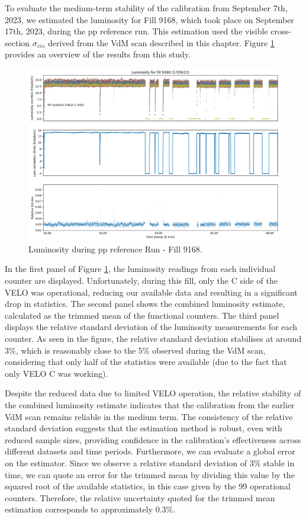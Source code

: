 To evaluate the medium-term stability of the calibration from September 7th, 2023, we estimated the luminosity for Fill 9168, which took place on September 17th, 2023, during the pp reference run. This estimation used the visible cross-section $\sigma_{vis}$ derived from the VdM scan described in this chapter. Figure \ref{fig:fill9168} provides an overview of the results from this study.
\begin{figure}
    \centering
    \includegraphics[width=\textwidth]{figures/fill9168.png}
    \caption{Luminosity during pp reference Run - Fill 9168.}
    \label{fig:fill9168}
\end{figure}
In the first panel of Figure \ref{fig:fill9168}, the luminosity readings from each individual counter are displayed. Unfortunately, during this fill, only the C side of the VELO was operational, reducing our available data and resulting in a significant drop in statistics. The second panel shows the combined luminosity estimate, calculated as the trimmed mean of the functional counters. The third panel displays the relative standard deviation of the luminosity measurements for each counter. As seen in the figure, the relative standard deviation stabilises at around 3\%, which is reasonably close to the 5\% observed during the VdM scan, considering that only half of the statistics were available (due to the fact that only VELO C was working).

Despite the reduced data due to limited VELO operation, the relative stability of the combined luminosity estimate indicates that the calibration from the earlier VdM scan remains reliable in the medium term. The consistency of the relative standard deviation suggests that the estimation method is robust, even with reduced sample sizes, providing confidence in the calibration's effectiveness across different datasets and time periods.
Furthermore, we can evaluate a global error on the estimator. Since we observe a relative standard deviation of 3\% stable in time, we can quote an error for the trimmed mean by dividing this value by the squared root of the available statistics, in this case given by the 99 operational counters. Therefore, the relative uncertainty quoted for the trimmed mean estimation corresponds to approximately 0.3\%. 